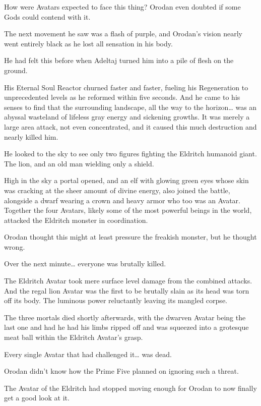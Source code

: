 \documentclass[a4paper,10pt]{book}
\begin{document}
How were Avatars expected to face this thing? Orodan even doubted if some Gods could contend with it.\par
The next movement he saw was a flash of purple, and Orodan’s vision nearly went entirely black as he lost all sensation in his body.\par
He had felt this before when Adeltaj turned him into a pile of flesh on the ground.\par
His Eternal Soul Reactor churned faster and faster, fueling his Regeneration to unprecedented levels as he reformed within five seconds. And he came to his senses to find that the surrounding landscape, all the way to the horizon… was an abyssal wasteland of lifeless gray energy and sickening growths. It was merely a large area attack, not even concentrated, and it caused this much destruction and nearly killed him.\par
He looked to the sky to see only two figures fighting the Eldritch humanoid giant. The lion, and an old man wielding only a shield.\par
High in the sky a portal opened, and an elf with glowing green eyes whose skin was cracking at the sheer amount of divine energy, also joined the battle, alongside a dwarf wearing a crown and heavy armor who too was an Avatar. Together the four Avatars, likely some of the most powerful beings in the world, attacked the Eldritch monster in coordination.\par
Orodan thought this might at least pressure the freakish monster, but he thought wrong.\par
Over the next minute… everyone was brutally killed.\par
The Eldritch Avatar took mere surface level damage from the combined attacks. And the regal lion Avatar was the first to be brutally slain as its head was torn off its body. The luminous power reluctantly leaving its mangled corpse.\par
The three mortals died shortly afterwards, with the dwarven Avatar being the last one and had he had his limbs ripped off and was squeezed into a grotesque meat ball within the Eldritch Avatar’s grasp.\par
Every single Avatar that had challenged it… was dead.\par
Orodan didn’t know how the Prime Five planned on ignoring such a threat.\par
The Avatar of the Eldritch had stopped moving enough for Orodan to now finally get a good look at it.\par
\end{document}
